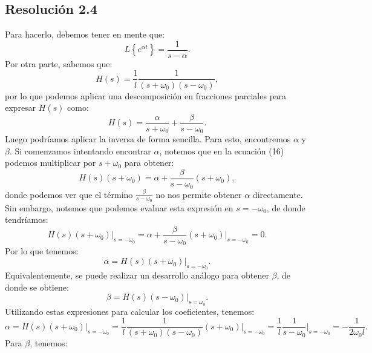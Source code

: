 \documentclass[
  11pt,
  letterpaper,
   addpoints,
   answers
  ]{exam}
\begin{document}
\begin{questions}
\begin{solution}
\subsection*{Resolución 2.4}
Para hacerlo, debemos tener en mente que:
\begin{equation}
L\left\{ e^{\alpha t} \right\} = \frac{1}{s - \alpha}.
\end{equation}
Por otra parte, sabemos que:
\begin{equation}
H(s) = \frac{1}{l} \frac{1}{(s + \omega_0)(s - \omega_0)},
\end{equation}
por lo que podemos aplicar una descomposición en fracciones parciales para expresar \(H(s)\) como:
\begin{equation}
H(s) = \frac{\alpha}{s + \omega_0} + \frac{\beta}{s - \omega_0}.
\end{equation}
Luego podríamos aplicar la inversa de forma sencilla. Para esto, encontremos \(\alpha\) y \(\beta\). Si comenzamos intentando encontrar \(\alpha\), notemos que en la ecuación (16) podemos multiplicar por \(s + \omega_0\) para obtener:
\begin{equation}
H(s)(s + \omega_0) = \alpha + \frac{\beta}{s - \omega_0} (s + \omega_0),
\end{equation}
donde podemos ver que el término \(\frac{\beta}{s - \omega_0}\) no nos permite obtener \(\alpha\) directamente. Sin embargo, notemos que podemos evaluar esta expresión en \(s = -\omega_0\), de donde tendríamos:
\begin{equation}
H(s) (s + \omega_0)\Big|_{s=-\omega_0} = \alpha + \frac{\beta}{s - \omega_0} (s + \omega_0)\Big|_{s=-\omega_0} = 0.
\end{equation}
Por lo que tenemos:
\begin{equation}
\alpha = H(s) (s + \omega_0)\Big|_{s=-\omega_0}.
\end{equation}
Equivalentemente, se puede realizar un desarrollo análogo para obtener \(\beta\), de donde se obtiene:
\begin{equation}
\beta = H(s) (s - \omega_0)\Big|_{s=\omega_0}.
\end{equation}
Utilizando estas expresiones para calcular los coeficientes, tenemos:
\begin{equation}
\alpha = H(s) (s + \omega_0)\Big|_{s=-\omega_0} = \frac{1}{l} \frac{1}{(s + \omega_0)(s - \omega_0)} (s + \omega_0)\Big|_{s=-\omega_0} = \frac{1}{l} \frac{1}{s - \omega_0}\Big|_{s=-\omega_0} = -\frac{1}{2 \omega_0 l}.
\end{equation}
Para \(\beta\), tenemos:

\end{solution}
\end{questions}
\end{document}

